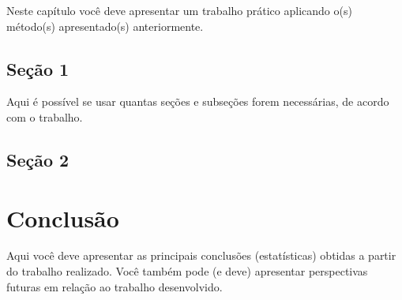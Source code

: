 \documentclass[12pt,oneside,a4paper,chapter=TITLE,english,brazil]{abntex2}
\begin{document}
Neste capítulo você deve apresentar um trabalho prático aplicando o(s) método(s) apresentado(s) anteriormente.

\section{Seção 1}
Aqui é possível se usar quantas seções e subseções forem necessárias, de acordo com o trabalho.

\section{Seção 2}


\chapter{Conclusão}

Aqui você deve apresentar as principais conclusões (estatísticas) obtidas a partir do trabalho realizado. Você também pode (e deve) apresentar perspectivas futuras em relação ao trabalho desenvolvido.


\postextual






%


%
%


\end{document}
